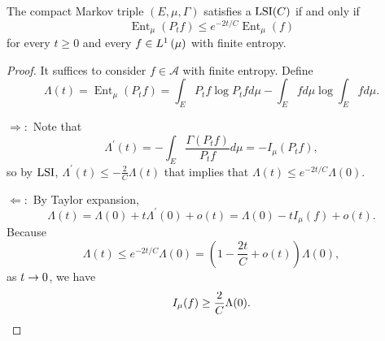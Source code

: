 \begin{prop}
    The compact Markov triple $(E,\mu,\Gamma)$ satisfies a $\operatorname{LSI}(C)$ if and only if
    \begin{equation*}
        \operatorname{Ent}_\mu\left(P_t f\right) \leq e^{-2 t / C} \operatorname{Ent}_\mu(f)
    \end{equation*}
    for every $t \geq 0$ and every $f \in L^1\left(\mu\right)$ with finite entropy.
\end{prop}
\begin{proof}
    It suffices to consider $f \in \mathcal{A}$ with finite entropy. Define
    \begin{equation*}
        \Lambda(t)=\operatorname{Ent}_\mu\left(P_t f\right)=\int_E P_t f \log P_t f d \mu-\int_E  f d \mu \log \int_E  f d \mu.
    \end{equation*}

    $\Rightarrow:$ Note that
    \begin{equation*}
        \Lambda^{\prime}(t)=-\int_E \frac{\Gamma\left(P_t f\right)}{P_t f} d \mu=-I_\mu\left(P_t f\right),
    \end{equation*}
    so by $\operatorname{LSI}$, $\Lambda^{\prime}(t) \leq-\frac{2}{C} \Lambda(t)$ that implies that $\Lambda(t) \leq e^{-2 t / C} \Lambda(0)$.

    $\Leftarrow:$ By Taylor expansion,
    \begin{equation*}
        \Lambda(t)=\Lambda(0)+t \Lambda^{\prime}(0)+o(t)=\Lambda(0)-t I_\mu(f)+o(t).
    \end{equation*}
    Because
    \begin{equation*}
        \Lambda(t) \leq e^{-2 t / C} \Lambda(0)=\left(1-\frac{2 t}{C}+o(t)\right) \Lambda(0),
    \end{equation*}
    as $t \rightarrow 0$, we have
    \begin{equation*}
        I_\mu(f) \geq \frac{2}{C} \Lambda(0). \qedhere
    \end{equation*}
\end{proof}

